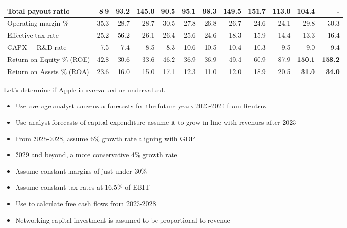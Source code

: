\begin{table}[ht]
\begin{tabular}{|l|r|r|r|r|r|r|r|r|r|r|r|}
    Total payout ratio           & 8.9           & 93.2          & 145.0         & 90.5          & 95.1          & 98.3          & 149.5         & 151.7         & 113.0         & 104.4         & -             \\ \hline
    Operating margin \%   & 35.3          & 28.7          & 28.7          & 30.5          & 27.8          & 26.8          & 26.7          & 24.6          & 24.1          & 29.8          & 30.3          \\ \hline
Effective tax rate    & 25.2          & 56.2          & 26.1          & 26.4          & 25.6          & 24.6          & 18.3          & 15.9          & 14.4          & 13.3          & 16.4          \\ \hline
CAPX + R\&D rate      & 7.5           & 7.4           & 8.5           & 8.3           & 10.6          & 10.5          & 10.4          & 10.3          & 9.5           & 9.0           & 9.4           \\ \hline
Return on Equity \% (ROE) & 42.8       & 30.6          & 33.6          & 46.2          & 36.9          & 36.9          & 49.4          & 60.9          & 87.9          & \textbf{150.1  }       & \textbf{158.2}         \\ \hline
Return on Assets \% (ROA) & 23.6       & 16.0          & 15.0          & 17.1          & 12.3          & 11.0          & 12.0          & 18.9          & 20.5          & \textbf{31.0}          & \textbf{34.0}          \\ \hline
    \end{tabular}
    \normalsize %
    \end{table}
    

Let's determine if Apple is overvalued or undervalued. 

\begin{itemize}
    \item Use average analyst consensus forecasts for the future years 2023-2024 from Reuters
    \item Use analyst forecasts of capital expenditure assume it to grow in line with revenues after 2023
    \item From 2025-2028, assume 6\% growth rate aligning with GDP
    \item 2029 and beyond, a more conservative 4\% growth rate
    \item Assume constant margins of just under 30\%
    \item Assume constant tax rates at 16.5\% of EBIT
    \item Use to calculate free cash flows from 2023-2028
    \item Networking capital investment is assumed to be proportional to revenue
\end{itemize}

